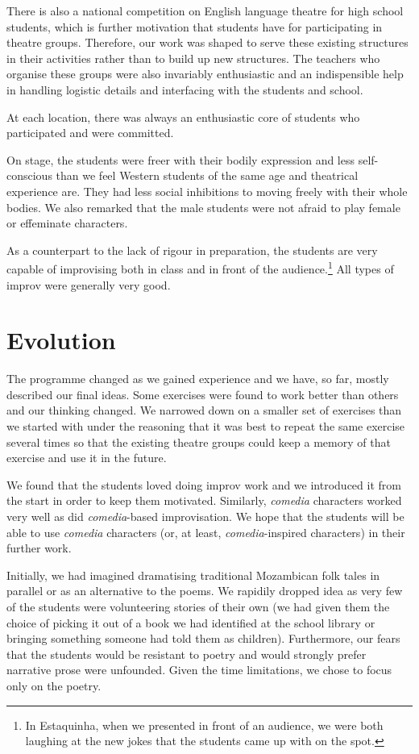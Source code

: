 \documentclass[article,twocolumn,twoside]{memoir}
\begin{document}
There is also a national competition on English language theatre for high
school students, which is further motivation that students have for
participating in theatre groups. Therefore, our work was shaped to serve these
existing structures in their activities rather than to build up new structures.
The teachers who organise these groups were also invariably enthusiastic and an
indispensible help in handling logistic details and interfacing with the
students and school.

At each location, there was always an enthusiastic core of students who
participated and were committed.

On stage, the students were freer with their bodily expression and less
self-conscious than we feel Western students of the same age and theatrical
experience are. They had less social inhibitions to moving freely with their
whole bodies. We also remarked that the male students were not afraid to play
female or effeminate characters.

As a counterpart to the lack of rigour in preparation, the students are
very capable of improvising both in class and in front of the
audience.\footnote{In Estaquinha, when we presented in front of an audience, we
were both laughing at the new jokes that the students came up with on the
spot.} All types of improv were generally very good.

\chapter{Evolution}

The programme changed as we gained experience and we have, so far, mostly
described our final ideas. Some exercises were found to work better than others
and our thinking changed. We narrowed down on a smaller set of exercises than
we started with under the reasoning that it was best to repeat the same
exercise several times so that the existing theatre groups could keep a memory
of that exercise and use it in the future.

We found that the students loved doing improv work and we introduced it from
the start in order to keep them motivated. Similarly, \textit{comedia}
characters worked very well as did \textit{comedia}-based improvisation. We
hope that the students will be able to use \textit{comedia} characters (or, at
least, \textit{comedia}-inspired characters) in their further work.

Initially, we had imagined dramatising traditional Mozambican folk tales in
parallel or as an alternative to the poems. We rapidily dropped idea as very
few of the students were volunteering stories of their own (we had given them
the choice of picking it out of a book we had identified at the school library
or bringing something someone had told them as children). Furthermore, our
fears that the students would be resistant to poetry and would strongly prefer
narrative prose were unfounded. Given the time limitations, we chose to focus
only on the poetry.
\end{document}
